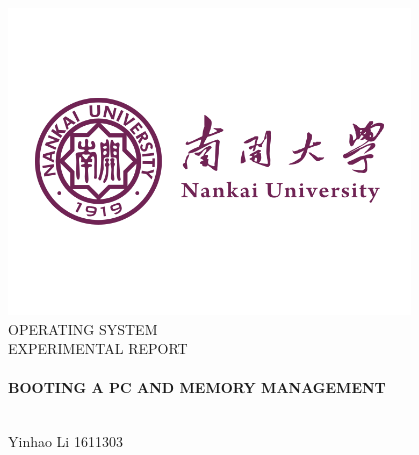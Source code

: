 \begin{titlepage}

\begin{center}


\includegraphics[width=0.8\textwidth]{figure/logoNankai}\\[1cm]

\textsc{\LARGE OPERATING SYSTEM }\\[1.5cm]

\textsc{\LARGE EXPERIMENTAL REPORT }\\[0.5cm]


\HRule \\[0.8cm]
{\huge \bfseries BOOTING A PC AND MEMORY MANAGEMENT}\\[0.4cm]

\HRule \\[3.0cm]

\begin{minipage}{0.4\textwidth}
\begin{center}
Yinhao Li 1611303
\end{center}
\end{minipage}

\vfill



\end{center}

\end{titlepage}



